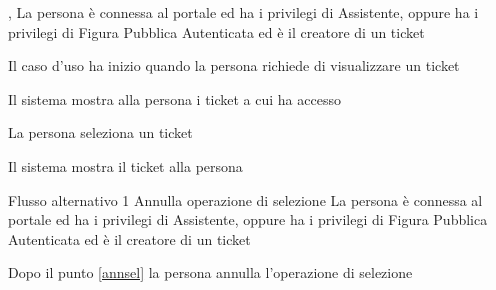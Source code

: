 
{, }
{La persona è connessa al portale ed ha i privilegi di Assistente, oppure ha i privilegi di Figura Pubblica Autenticata ed è il creatore di un ticket}
{\postNulle}
{\begin{enumCU}
	\item Il caso d'uso ha inizio quando la persona richiede di visualizzare un ticket
	\item Il sistema mostra alla persona i ticket a cui ha accesso\label{annsel}
	\item La persona seleziona un ticket
	\item Il sistema mostra il ticket alla persona
\end{enumCU}}
%	
{Flusso alternativo 1}%
{Annulla operazione di selezione}%
{La persona è connessa al portale ed ha i privilegi di Assistente, oppure ha i privilegi di Figura Pubblica Autenticata ed è il creatore di un ticket}%
{\postNulle}%
{\begin{enumCU}
		\item Dopo il punto \ref{annsel} la persona annulla l'operazione di selezione
\end{enumCU}}%


